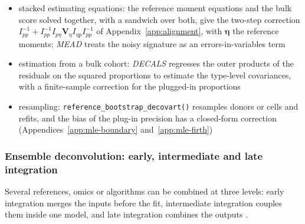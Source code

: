 \documentclass[pdflatex, sn-nature]{sn-jnl}
\theoremstyle{thmstyleone}%
\theoremstyle{thmstyletwo}%
\theoremstyle{thmstylethree}%
\begin{document}
\begin{itemize}
\begin{itemize}
          degrees of freedom and scale \(\boldsymbol{\Sigma}_{j}\), so the bulk and reference log-likelihoods can be maximised
          together, with a graphical-lasso penalty on the precisions; the Schur complement of the joint
          information then widens the intervals for \(\boldsymbol{p}\), the likelihood counterpart of the noisy-mean term of
          \emph{RNA-Sieve} \cite{erdmann-phamLikelihoodbasedDeconvolutionBulk2021}
    \item stacked estimating equations: the reference moment equations and the bulk score solved together, with
          a \gls{sandwich} over both, give the two-step correction
          \(I_{pp}^{-1}+I_{pp}^{-1}I_{p\eta}\boldsymbol{V}_{\eta}I_{\eta p}I_{pp}^{-1}\) of Appendix~\ref{app:alignment}, with \(\boldsymbol{\eta}\) the reference
          moments; \emph{MEAD} treats the noisy signature as an errors-in-variables term
          \cite{xieStatisticalInferenceCell2026}
    \item estimation from a bulk cohort: \emph{DECALS} regresses the outer products of the residuals on the squared
          proportions to estimate the type-level covariances, with a finite-sample correction for the
          plugged-in proportions \cite{caiStatisticalInferenceCelltype2024}
    \item resampling: \texttt{reference\_bootstrap\_decovart()} resamples donors or cells and refits, and the bias of
          the plug-in precision has a closed-form correction (Appendices~\ref{app:mle-boundary} and~\ref{app:mle-firth})
  \end{itemize}
\end{itemize}

\subsubsection{Ensemble deconvolution: early, intermediate and late integration}
\label{sec:ensembles}

Several references, omics or algorithms can be combined at three levels: early integration merges the inputs before
the fit, intermediate integration couples them inside one model, and late integration combines the outputs
\cite{barbotPromisesLimitsMultimodal2026}.
\end{document}

